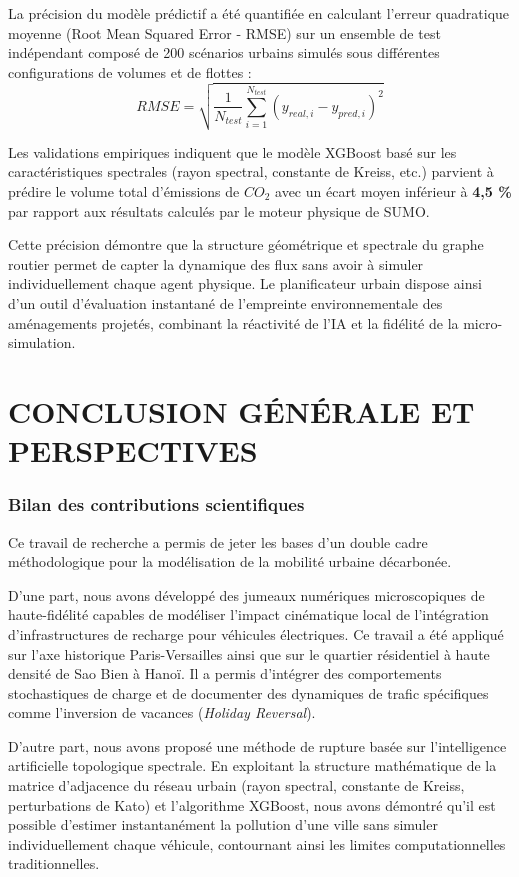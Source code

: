 \documentclass[10pt, a4paper]{article}
\begin{document}
La précision du modèle prédictif a été quantifiée en calculant l'erreur
quadratique moyenne (Root Mean Squared Error - RMSE) sur un ensemble de
test indépendant composé de 200 scénarios urbains simulés sous
différentes configurations de volumes et de flottes :
\[RMSE = \sqrt{\frac{1}{N_{test}} \sum_{i=1}^{N_{test}} \left( y_{real, i} - y_{pred, i} \right)^2}\]

Les validations empiriques indiquent que le modèle XGBoost basé sur les
caractéristiques spectrales (rayon spectral, constante de Kreiss, etc.)
parvient à prédire le volume total d'émissions de \(CO_2\) avec un écart
moyen inférieur à \textbf{4,5 \%} par rapport aux résultats calculés par
le moteur physique de SUMO.

Cette précision démontre que la structure géométrique et spectrale du
graphe routier permet de capter la dynamique des flux sans avoir à
simuler individuellement chaque agent physique. Le planificateur urbain
dispose ainsi d'un outil d'évaluation instantané de l'empreinte
environnementale des aménagements projetés, combinant la réactivité de
l'IA et la fidélité de la micro-simulation.

\newpage

\section{CONCLUSION GÉNÉRALE ET
PERSPECTIVES}\label{conclusion-guxe9nuxe9rale-et-perspectives}

\subsubsection{Bilan des contributions
scientifiques}\label{bilan-des-contributions-scientifiques}

Ce travail de recherche a permis de jeter les bases d'un double cadre
méthodologique pour la modélisation de la mobilité urbaine décarbonée.

D'une part, nous avons développé des jumeaux numériques microscopiques
de haute-fidélité capables de modéliser l'impact cinématique local de
l'intégration d'infrastructures de recharge pour véhicules électriques.
Ce travail a été appliqué sur l'axe historique Paris-Versailles ainsi
que sur le quartier résidentiel à haute densité de Sao Bien à Hanoï. Il
a permis d'intégrer des comportements stochastiques de charge et de
documenter des dynamiques de trafic spécifiques comme l'inversion de
vacances (\emph{Holiday Reversal}).

D'autre part, nous avons proposé une méthode de rupture basée sur
l'intelligence artificielle topologique spectrale. En exploitant la
structure mathématique de la matrice d'adjacence du réseau urbain (rayon
spectral, constante de Kreiss, perturbations de Kato) et l'algorithme
XGBoost, nous avons démontré qu'il est possible d'estimer instantanément
la pollution d'une ville sans simuler individuellement chaque véhicule,
contournant ainsi les limites computationnelles traditionnelles.
\end{document}
